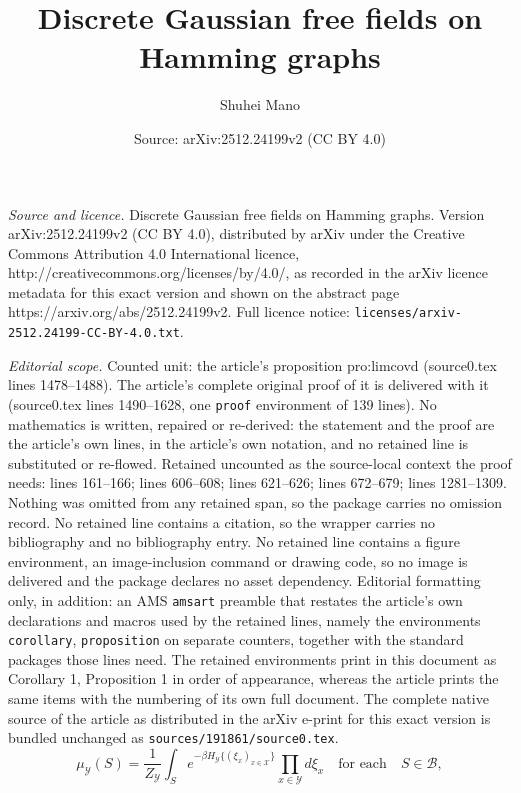 \documentclass[10pt,a4paper]{amsart}
\title{Discrete Gaussian free fields on Hamming graphs}
\author{Shuhei Mano}
\date{Source: arXiv:2512.24199v2 (CC BY 4.0)}
\begin{document}
\maketitle

\noindent\emph{Source and licence.} Discrete Gaussian free fields on Hamming graphs. Version arXiv:2512.24199v2 (CC BY 4.0), distributed by arXiv under the Creative Commons Attribution 4.0 International licence, http://creativecommons.org/licenses/by/4.0/, as recorded in the arXiv licence metadata for this exact version and shown on the abstract page https://arxiv.org/abs/2512.24199v2. Full licence notice: \texttt{licenses/arxiv-2512.24199-CC-BY-4.0.txt}.\par\smallskip

\noindent\textit{Editorial scope.} Counted unit: the article's proposition pro:limcovd (source0.tex lines 1478--1488). The article's complete original proof of it is delivered with it (source0.tex lines 1490--1628, one \texttt{proof} environment of 139 lines). No mathematics is written, repaired or re-derived: the statement and the proof are the article's own lines, in the article's own notation, and no retained line is substituted or re-flowed.  Retained uncounted as the source-local context the proof needs: lines 161--166; lines 606--608; lines 621--626; lines 672--679; lines 1281--1309.  Nothing was omitted from any retained span, so the package carries no omission record.  No retained line contains a citation, so the wrapper carries no bibliography and no bibliography entry.  No retained line contains a figure environment, an image-inclusion command or drawing code, so no image is delivered and the package declares no asset dependency.  Editorial formatting only, in addition: an AMS \texttt{amsart} preamble that restates the article's own declarations and macros used by the retained lines, namely the environments \texttt{corollary}, \texttt{proposition} on separate counters, together with the standard packages those lines need.  The retained environments print in this document as Corollary 1, Proposition 1 in order of appearance, whereas the article prints the same items with the numbering of its own full document.  The complete native source of the article as distributed in the arXiv e-print for this exact version is bundled unchanged as \texttt{sources/191861/source0.tex}.
\begin{equation}\label{gibbs}
  \mu_\mathcal{Y}(S)=\frac{1}{Z_\mathcal{Y}}\int_S
  e^{-\beta H_\mathcal{Y}\{(\xi_x)_{x\in\mathcal{X}}\}}
  \prod_{x\in\mathcal{Y}} d\xi_x
  \quad \text{for~each} \quad S\in\mathcal{B},
\end{equation}
\end{document}
